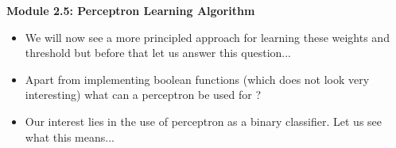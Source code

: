 \documentclass[serif, aspectratio=169]{beamer}
\newcommand\myheading[1]{%
\par\bigskip
{\Large\bfseries#1}\par\smallskip}
\begin{document}
  \begin{frame}
    \myheading{Module 2.5: Perceptron Learning Algorithm}
  \end{frame}

\begin{frame}
\begin{itemize}\justifying
\item<1-> We will now see a more principled approach for learning these weights and threshold but before that let us answer this question...
\item<2-> Apart from implementing boolean functions (which does not look very interesting) what can a perceptron be used for ?
\item<3-> Our interest lies in the use of perceptron as a binary classifier. Let us see what this means...
\end{itemize}
\end{frame}
\end{document}
